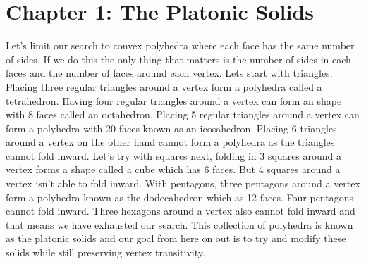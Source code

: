 \documentclass{article}
\begin{document}
\section*{Chapter 1: The Platonic Solids}
Let's limit our search to convex polyhedra where each face has the same number of sides. If we do this the only thing that matters is the number of sides in each faces and the number of faces around each vertex. Lets start with triangles. Placing three regular triangles around a vertex form a polyhedra called a tetrahedron. Having four regular triangles around a vertex can form an shape with 8 faces called an octahedron. Placing 5 regular triangles around a vertex can form a polyhedra with 20 faces known as an icosahedron. Placing 6 triangles around a vertex on the other hand cannot form a polyhedra as the triangles cannot fold inward. Let's try with squares next, folding in 3 squares around a vertex forms a shape called a cube which has 6 faces. But 4 squares around a vertex isn't able to fold inward. With pentagons, three pentagons around a vertex form a polyhedra known as the dodecahedron which as 12 faces. Four pentagons cannot fold inward. Three hexagons around a vertex also cannot fold inward and that means we have exhausted our search. This collection of polyhedra is known as the platonic solids and our goal from here on out is to try and modify these solids while still preserving vertex transitivity.
\end{document}

